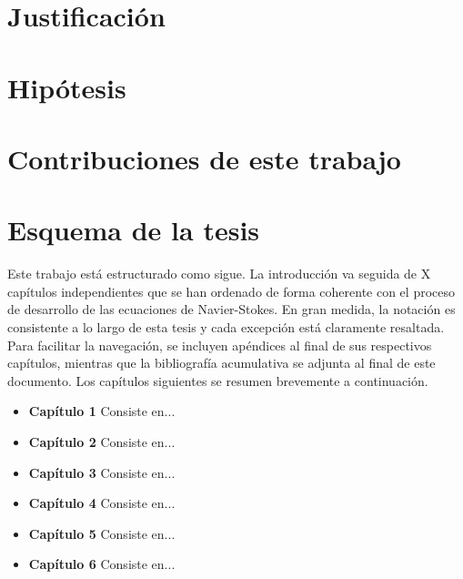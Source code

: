 \section{Justificación}

\section{Hipótesis}


\section{Contribuciones de este trabajo}


\section{Esquema de la tesis}
Este trabajo está estructurado como sigue. La introducción va seguida de X capítulos independientes que se han ordenado de forma coherente con el proceso de desarrollo de las ecuaciones de Navier-Stokes. En gran medida, la notación es consistente a lo largo de esta tesis y cada excepción está claramente resaltada. Para facilitar la navegación, se incluyen apéndices al final de sus respectivos capítulos, mientras que la bibliografía acumulativa se adjunta al final de este documento. Los capítulos siguientes se resumen brevemente a continuación.
\begin{itemize}
    \item \textbf{Capítulo 1} Consiste en...
    \item \textbf{Capítulo 2} Consiste en...
    \item \textbf{Capítulo 3} Consiste en...
    \item \textbf{Capítulo 4} Consiste en...
    \item \textbf{Capítulo 5} Consiste en...
    \item \textbf{Capítulo 6} Consiste en...
\end{itemize}













